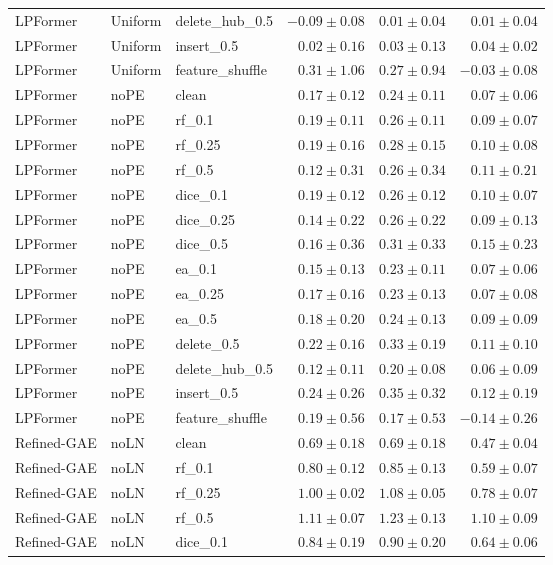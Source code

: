 \documentclass[UTF8,a4paper,11pt,fontset=fandol]{ctexart}
\begin{document}
{\begin{longtable}{lllrrr}
LPFormer & Uniform & delete\_hub\_0.5 & $-0.09\pm0.08$ & $0.01\pm0.04$ & $0.01\pm0.04$ \\
LPFormer & Uniform & insert\_0.5 & $0.02\pm0.16$ & $0.03\pm0.13$ & $0.04\pm0.02$ \\
LPFormer & Uniform & feature\_shuffle & $0.31\pm1.06$ & $0.27\pm0.94$ & $-0.03\pm0.08$ \\
LPFormer & noPE & clean & $0.17\pm0.12$ & $0.24\pm0.11$ & $0.07\pm0.06$ \\
LPFormer & noPE & rf\_0.1 & $0.19\pm0.11$ & $0.26\pm0.11$ & $0.09\pm0.07$ \\
LPFormer & noPE & rf\_0.25 & $0.19\pm0.16$ & $0.28\pm0.15$ & $0.10\pm0.08$ \\
LPFormer & noPE & rf\_0.5 & $0.12\pm0.31$ & $0.26\pm0.34$ & $0.11\pm0.21$ \\
LPFormer & noPE & dice\_0.1 & $0.19\pm0.12$ & $0.26\pm0.12$ & $0.10\pm0.07$ \\
LPFormer & noPE & dice\_0.25 & $0.14\pm0.22$ & $0.26\pm0.22$ & $0.09\pm0.13$ \\
LPFormer & noPE & dice\_0.5 & $0.16\pm0.36$ & $0.31\pm0.33$ & $0.15\pm0.23$ \\
LPFormer & noPE & ea\_0.1 & $0.15\pm0.13$ & $0.23\pm0.11$ & $0.07\pm0.06$ \\
LPFormer & noPE & ea\_0.25 & $0.17\pm0.16$ & $0.23\pm0.13$ & $0.07\pm0.08$ \\
LPFormer & noPE & ea\_0.5 & $0.18\pm0.20$ & $0.24\pm0.13$ & $0.09\pm0.09$ \\
LPFormer & noPE & delete\_0.5 & $0.22\pm0.16$ & $0.33\pm0.19$ & $0.11\pm0.10$ \\
LPFormer & noPE & delete\_hub\_0.5 & $0.12\pm0.11$ & $0.20\pm0.08$ & $0.06\pm0.09$ \\
LPFormer & noPE & insert\_0.5 & $0.24\pm0.26$ & $0.35\pm0.32$ & $0.12\pm0.19$ \\
LPFormer & noPE & feature\_shuffle & $0.19\pm0.56$ & $0.17\pm0.53$ & $-0.14\pm0.26$ \\
Refined-GAE & noLN & clean & $0.69\pm0.18$ & $0.69\pm0.18$ & $0.47\pm0.04$ \\
Refined-GAE & noLN & rf\_0.1 & $0.80\pm0.12$ & $0.85\pm0.13$ & $0.59\pm0.07$ \\
Refined-GAE & noLN & rf\_0.25 & $1.00\pm0.02$ & $1.08\pm0.05$ & $0.78\pm0.07$ \\
Refined-GAE & noLN & rf\_0.5 & $1.11\pm0.07$ & $1.23\pm0.13$ & $1.10\pm0.09$ \\
Refined-GAE & noLN & dice\_0.1 & $0.84\pm0.19$ & $0.90\pm0.20$ & $0.64\pm0.06$ \\

\end{longtable}}
\end{document}
